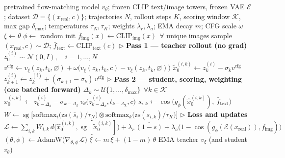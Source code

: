 \documentclass[10pt]{article}
\newcommand{\sg}{\operatorname{sg}}
\newcommand{\cossim}{\operatorname{cos}}
\newcommand{\xhat}{\hat{x}_0}
\newcommand{\xtil}{\tilde{x}_0}
\newcommand{\ftext}{\bar{f}_{\mathrm{text}}}
\newcommand{\fimg}{\bar{f}_{\mathrm{img}}}
\begin{document}
\begin{algorithm}[t]
\caption{Encoder-Scored Self-Distillation (v5)}
\label{alg:v5}
\begin{algorithmic}[1]
\Require pretrained flow-matching model $v_{\theta}$; frozen CLIP text/image
  towers, frozen VAE $\mathcal{E}$; dataset
  $\mathcal{D} = \{(x_{\mathrm{real}}, c)\}$;
  trajectories $N$, rollout steps $K$, scoring window $\mathcal{K}$,
  max gap $\delta_{\max}$; temperatures $\tau_N, \tau_K$;
  weights $\lambda_r, \lambda_a$; EMA decay $m$; CFG scale $\omega$
\State $\xi \gets \theta$ 
\State $\phi \gets$ random init 
\State $\fimg(x) \gets \mathrm{CLIP_{img}}(x)\ \ \forall$ unique images
  \State sample $(x_{\mathrm{real}}, c) \sim \mathcal{D}$;\quad
    $\ftext \gets \mathrm{CLIP_{text}}(c)$
  \Statex \(\triangleright\) \textbf{Pass 1 --- teacher rollout (no grad)}
  \State $z^{(i)}_0 \sim \mathcal{N}(0, I), \quad i = 1, \dots, N$
    \State $v^{\mathrm{cfg}} \gets v_\xi(z_k, t_k, \varnothing)
      + \omega \big( v_\xi(z_k, t_k, c) - v_\xi(z_k, t_k, \varnothing) \big)$
      \State $\xtil^{(i,k)} \gets z^{(i)}_k - \sigma_k v^{\mathrm{cfg}}$
    \EndIf
    \State $z^{(i)}_{k+1} \gets z^{(i)}_k + (\sigma_{k+1} - \sigma_k)\, v^{\mathrm{cfg}}$
  \EndFor
  \Statex \(\triangleright\) \textbf{Pass 2 --- student, scoring, weighting (one batched forward)}
  \State $\Delta_k \sim \mathcal{U}\{1, \dots, \delta_{\max}\}\ \ \forall k \in \mathcal{K}$
  \State $\xhat^{(i,k)} \gets z^{(i)}_{k-\Delta_k}
    - \sigma_{k-\Delta_k}\, v_\theta\big(z^{(i)}_{k-\Delta_k}, t_{k-\Delta_k}, c\big)$
  \State $s_{i,k} \gets \cossim\big( g_\phi(\xhat^{(i,k)}),\ \ftext \big)$
  \State $W \gets \sg\big[ \mathrm{softmax}_i\big( \mathrm{zs}(\bar{s}_i) / \tau_N \big)
    \otimes \mathrm{softmax}_k\big( \mathrm{zs}(s_{i,k}) / \tau_K \big) \big]$
  \Statex \(\triangleright\) \textbf{Loss and updates}
  \State $\mathcal{L} \gets \sum_{i,k} W_{i,k}\,
    d\big( \xhat^{(i,k)}, \sg[\xtil^{(i,k)}] \big)
    + \lambda_r\, \overline{(1 - s)}
    + \lambda_a \big( 1 - \cossim( g_\phi(\mathcal{E}(x_{\mathrm{real}})), \fimg ) \big)$
  \State $(\theta, \phi) \gets \mathrm{AdamW}\big( \nabla_{\theta, \phi}\, \mathcal{L} \big)$
  \State $\xi \gets m\,\xi + (1 - m)\,\theta$ 
\EndFor
\State \Return EMA teacher $v_\xi$ (and student $v_\theta$)
\end{algorithmic}
\end{algorithm}
\end{document}
